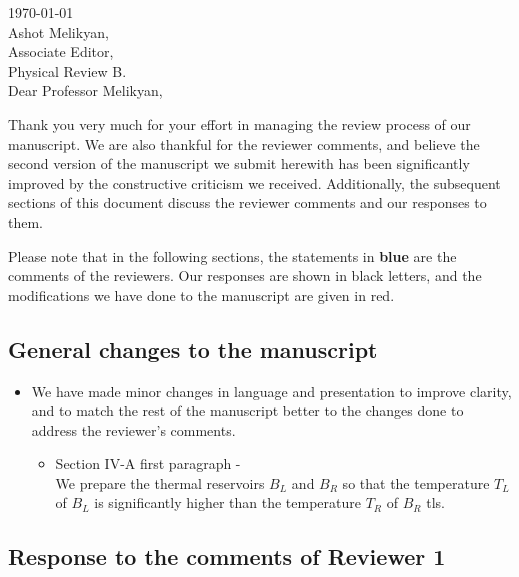 \documentclass{article}
\begin{document}

\today\\

Ashot Melikyan,\\
Associate Editor,\\
Physical Review B.\\

Dear Professor Melikyan,

Thank you very much for your effort in managing the review process of our manuscript. We are also thankful for the reviewer comments, and believe the second version of the manuscript we submit herewith has been significantly improved by the constructive criticism we received. Additionally, the subsequent sections of this document discuss the reviewer comments and our responses to them.

Please note that in the following sections, the statements in {\color{RoyalBlue} \textbf{blue}} are the comments of the reviewers. Our responses are shown in black letters, and the modifications we have done to the manuscript are given in {\color{Maroon} red}.

\subsection*{General changes to the manuscript}

\begin{itemize}
    \item We have made minor changes in language and presentation to improve clarity, and to match the rest of the manuscript better to the changes done to address the reviewer's comments.
    \begin{itemize}
        \item Section IV-A first paragraph - \\
            {\color{Maroon} We prepare the thermal reservoirs $B_L$ and $B_R$ so that the temperature $T_L$ of $B_L$ is significantly higher than the temperature $T_R$ of $B_R$ \acrshort{tls}.}
    \end{itemize}
\end{itemize}

\subsection*{Response to the comments of Reviewer 1}
\end{document}
